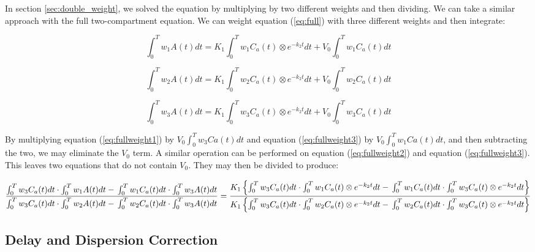In section \ref{sec:double_weight}, we solved the equation by
multiplying by two different weights and then dividing.  We can take a
similar approach with the full two-compartment equation.  We can
weight equation (\ref{eq:full}) with three different weights and then
integrate:

\begin{equation}
\int_{0}^{T} w_{1}A(t)dt = K_{1} \int_{0}^{T} w_{1}C_{a}(t) \otimes e^{-k_{2}t} dt + V_{0} \int_{0}^{T}w_{1}C_{a}(t) dt  \label{eq:fullweight1}
\end{equation}

\begin{equation}
\int_{0}^{T} w_{2}A(t)dt = K_{1} \int_{0}^{T} w_{2}C_{a}(t) \otimes e^{-k_{2}t} dt + V_{0} \int_{0}^{T}w_{2}C_{a}(t)dt  \label{eq:fullweight2}
\end{equation}

\begin{equation}
\int_{0}^{T} w_{3}A(t)dt = K_{1} \int_{0}^{T} w_{3}C_{a}(t) \otimes e^{-k_{2}t} dt + V_{0} \int_{0}^{T}w_{3}C_{a}(t) dt  \label{eq:fullweight3}
\end{equation}

By multiplying equation (\ref{eq:fullweight1}) by $V_{0} \int_{0}^{T}
w_{3}Ca(t) dt$ and equation (\ref{eq:fullweight3}) by $V_{0}
\int_{0}^{T} w_{1}Ca(t) dt$, and then subtracting the two, we may eliminate the
$V_{0}$ term.  A similar operation can be performed on equation
(\ref{eq:fullweight2}) and equation (\ref{eq:fullweight3}).  This
leaves two equations that do not contain $V_{0}$.  They may then be
divided to produce:

\begin{equation}
\frac{\int_{0}^{T} w_{3}C_{a}(t)dt \cdot \int_{0}^{T} w_{1}A(t)dt - \\
      \int_{0}^{T} w_{1}C_{a}(t)dt \cdot \int_{0}^{T} w_{3}A(t)dt}
     {\int_{0}^{T} w_{3}C_{a}(t)dt \cdot \int_{0}^{T} w_{2}A(t)dt - \\
      \int_{0}^{T} w_{2}C_{a}(t)dt \cdot \int_{0}^{T} w_{3}A(t)dt}
=
\frac{K_{1}\left\{\int_{0}^{T} w_{3}C_{a}(t)dt \cdot \int_{0}^{T} w_{1}C_{a}(t)\otimes e^{-k_{2}t} dt - \\
                  \int_{0}^{T} w_{1}C_{a}(t)dt \cdot \int_{0}^{T} w_{3}C_{a}(t)\otimes e^{-k_{2}t} dt
           \right\}}
     {K_{1}\left\{\int_{0}^{T} w_{3}C_{a}(t)dt \cdot \int_{0}^{T} w_{2}C_{a}(t)\otimes e^{-k_{2}t} dt - \\
                  \int_{0}^{T} w_{2}C_{a}(t)dt \cdot \int_{0}^{T} w_{3}C_{a}(t)\otimes e^{-k_{2}t} dt
           \right\}}
\end{equation}



\subsection{Delay and Dispersion Correction}









